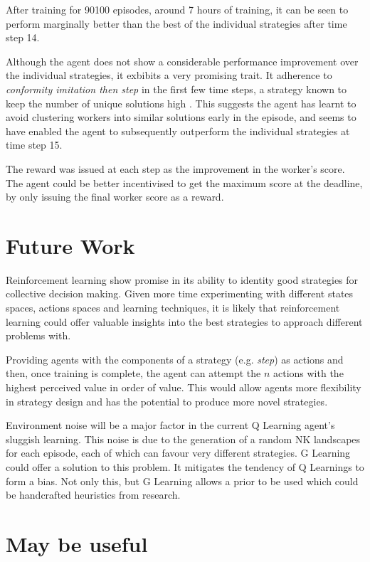\documentclass[conference]{IEEEtran}
\begin{document}
After training for 90100 episodes, around 7 hours of training,
it can be seen to perform marginally better
than the best of the individual strategies after time step 14.

Although the agent does not show a considerable performance improvement
over the individual strategies,
it exbibits a very promising trait.
It adherence to \emph{conformity imitation then step}
in the first few time steps,
a strategy known to keep the number of unique solutions
high \cite{sociallearning}.
This suggests the agent has learnt to avoid
clustering workers into similar solutions early in the episode,
and seems to have enabled the agent to subsequently outperform
the individual strategies at time step 15.

The reward was issued at each step as the improvement in the worker's score.
The agent could be better incentivised to get the maximum score at the deadline,
by only issuing the final worker score as a reward.


\section{Future Work}
Reinforcement learning show promise
in its ability to identity good strategies for collective decision making.
Given more time experimenting with different
states spaces, actions spaces and learning techniques,
it is likely that reinforcement learning could offer valuable insights
into the best strategies to approach different problems with.

Providing agents with the components of a strategy (e.g. \emph{step}) as actions
and then, once training is complete, the agent can attempt the $n$ actions
with the highest perceived value in order of value.
This would allow agents more flexibility in strategy design
and has the potential to produce more novel strategies.

Environment noise will be a major factor in
the current Q Learning agent's sluggish learning.
This noise is due to the generation of a random NK landscapes for each episode,
each of which can favour very different strategies.
G Learning \cite{glearning}
could offer a solution to this problem.
It mitigates the tendency of Q Learnings to form a bias.
Not only this, but G Learning allows a prior to be used
which could be handcrafted heuristics from research.


{}



\section{May be useful}
\end{document}
